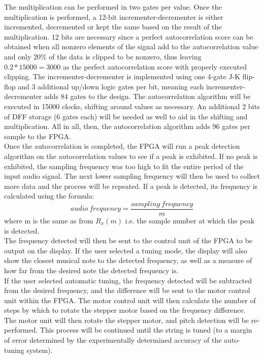 \documentclass[aps,letterpaper,10pt]{revtex4}
\begin{document}
The multiplication can be performed in two gates per value. Once the multiplication is performed, a 12-bit incrementer-decrementer is either incremented, decremented or kept the same based on the result of the multiplication. 12 bits are necessary since a perfect autocorrelation score can be obtained when all nonzero elements of the signal add to the autocorrelation value and only 20\% of the data is clipped to be nonzero, thus leaving $0.2*15000 = 3000$ as the perfect autocorrelation score with properly executed clipping. The incrementer-decrementer is implemented using one 4-gate J-K flip-flop and 3 additional up/down logic gates per bit, meaning each incrementer-decrementer adds 84 gates to the design. The autocorrelation algorithm will be executed in 15000 clocks, shifting around values as necessary. An additional 2 bits of DFF storage (6 gates each) will be needed as well to aid in the shifting and multiplication. All in all, then, the autocorrelation algorithm adds 96 gates per sample to the FPGA. \\

Once the autocorrelation is completed, the FPGA will run a peak detection algorithm on the autocorrelation values to see if a peak is exhibited. If no peak is exhibited, the sampling frequency was too high to fit the entire period of the input audio signal. The next lower sampling frequency will then be used to collect more data and the process will be repeated. If a peak is detected, its frequency is calculated using the formula:
$$audio~frequency = \frac{sampling~frequency}{m}$$ where m is the same as from $R_x(m)$ i.e. the sample number at which the peak is detected. \\

The frequency detected will then be sent to the control unit of the FPGA to be output on the display. If the user selected a tuning mode, the display will also show the closest musical note to the detected frequency, as well as a measure of how far from the desired note the detected frequency is. \\

If the user selected automatic tuning, the frequency detected will be subtracted from the desired frequency, and the difference will be sent to the motor control unit within the FPGA. The motor control unit will then calculate the number of steps by which to rotate the stepper motor based on the frequency difference. The motor unit will then rotate the stepper motor, and pitch detection will be re-performed. This process will be continued until the string is tuned (to a margin of error determined by the experimentally determined accuracy of the auto-tuning system).\\
\end{document}
